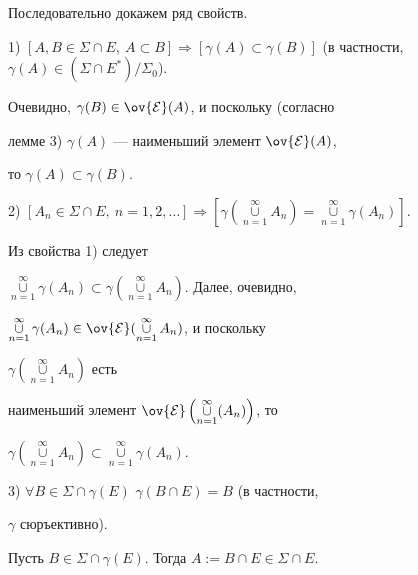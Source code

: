 \begin{pf} Последовательно докажем ряд свойств.





1) $[A,B\in\Sigma\cap E,\ A\subset B]\Rightarrow[\gamma(A)


\subset\gamma(B)]$ (в частности, $\gamma(A)\in(\Sigma\cap


E^\ast)/\Sigma_0$).





Очевидно, $\gamma(B)\in\ov{\cal E}(A)$, и поскольку (согласно


лемме 3) $\gamma(A)$ --- наименьший элемент $\ov{\cal E}(A)$,


то $\gamma(A)\subset\gamma(B)$.





2) $[A_n\in\Sigma\cap E,\ n=1,2,\dotsc]\Rightarrow[


\gamma(\mathop{\cup}\limits_{n=1}^\infty


A_n)=\mathop{\cup}\limits_{n=1}^\infty\gamma(A_n)]$.





Из свойства 1) следует


$\mathop{\cup}\limits_{n=1}^\infty\gamma(A_n)\subset\gamma(\mathop


{\cup}\limits_{n=1}^\infty A_n)$. Далее, очевидно,


$\mathop{\cup}\limits_{n=1}^\infty\gamma(A_n)\in\ov{\cal


E}(\mathop{\cup}\limits_{n=1}^\infty A_n)$, и поскольку


$\gamma\left(\mathop{\cup}\limits_{n=1}^\infty A_n\right)$ есть


наименьший элемент $\ov{\cal


E}\left(\mathop{\cup}\limits_{n=1}^\infty(A_n)\right)$, то


$\gamma\left(\mathop{\cup}\limits_{n=1}^\infty


A_n\right)\subset\mathop{\cup}\limits_{n=1}^\infty\gamma(A_n)$.





3) $\forall B\in\Sigma\cap\gamma(E)$ $\gamma(B\cap E)=B$ (в частности,


$\gamma$ сюръективно).





Пусть $B\in\Sigma\cap\gamma(E)$. Тогда $A:= B\cap E\in\Sigma\cap E$.



\end{pf}
